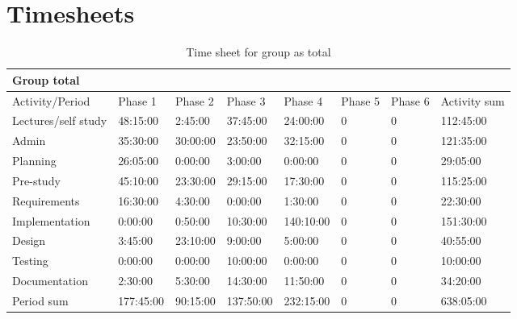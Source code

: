 \documentclass[11pt]{book}
\begin{document}
\chapter{Timesheets}
\begin{table}[H]
\centering
\begin{tabular}{| l | l | l | l | l | l | l | l |}
    \hline
    Group total         &             &             &             &             &             &             &                 \\ \hline                        
    Activity/Period     & Phase 1     & Phase 2     & Phase  3    & Phase 4     & Phase 5     & Phase 6     & Activity sum    \\ \hline
    Lectures/self study & 48:15:00    & 2:45:00     & 37:45:00    & 24:00:00    & 0           & 0           & 112:45:00       \\ \hline
    Admin               & 35:30:00    & 30:00:00    & 23:50:00    & 32:15:00    & 0           & 0           & 121:35:00       \\ \hline
    Planning            & 26:05:00    & 0:00:00     & 3:00:00     & 0:00:00     & 0           & 0           & 29:05:00        \\ \hline
    Pre-study           & 45:10:00    & 23:30:00    & 29:15:00    & 17:30:00    & 0           & 0           & 115:25:00       \\ \hline
    Requirements        & 16:30:00    & 4:30:00     & 0:00:00     & 1:30:00     & 0           & 0           & 22:30:00        \\ \hline
    Implementation      & 0:00:00     & 0:50:00     & 10:30:00    & 140:10:00   & 0           & 0           & 151:30:00       \\ \hline
    Design              & 3:45:00     & 23:10:00    & 9:00:00     & 5:00:00     & 0           & 0           & 40:55:00        \\ \hline
    Testing             & 0:00:00     & 0:00:00     & 10:00:00    & 0:00:00     & 0           & 0           & 10:00:00        \\ \hline
    Documentation       & 2:30:00     & 5:30:00     & 14:30:00    & 11:50:00    & 0           & 0           & 34:20:00        \\ \hline
    Period sum          & 177:45:00   & 90:15:00    & 137:50:00   & 232:15:00   & 0           & 0           & 638:05:00       \\ \hline
\end{tabular}
\label{tab:appendix_timesheets_group}
\caption{Time sheet for group as total}
\end{table}
\end{document}
